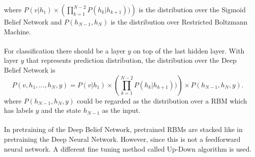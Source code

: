 \documentclass[12pt]{article}
\begin{document}
where $P(v| h_1) \times\left(\prod_{k=1}^{N-2}  P(h_k| h_{k+1}))\right)$ is the distribution over the Sigmoid Belief Network and $P(h_{N-1},h_N)$ is the distribution over Restricted Boltzmann Machine.\\
\\
For classification there should be a layer $y$ on top of the last hidden layer. With  layer $y$ that represents prediction distribution, the distribution over the Deep Belief Network is
\begin{equation}
P(v, h_1, ..., h_N, y)  = P(v| h_1) \times\left(\prod_{k=1}^{N-2}  P(h_k| h_{k+1}))\right)\times P(h_{N-1},h_N, y).
\end{equation}
where $P(h_{N-1},h_N, y)$ could be regarded as the distribution over a RBM which has labels $y$ and the state $h_{N-1}$ as the input.\\
\\
In pretraining of the Deep Belief Network, pretrained RBMs are stacked like in pretraining the Deep Neural Network. However, since this is not a feedforward neural network. A different fine tuning method called Up-Down algorithm is used.
\end{document}

